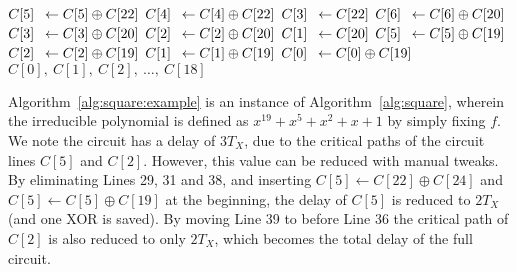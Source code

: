 \documentclass{ufscThesis}
\newcommand{\mathbox}[3][l]{\makebox[\widthof{$#2$}][#1]{$#3$}}
\begin{document}
\begin{algorithm}
\begin{multicols}{2}
\begin{algorithmic}[1]
\STATE $\mathbox{C[22]}{C[5]} \leftarrow C[5]  \oplus  C[22]$
\STATE $\mathbox{C[22]}{C[4]} \leftarrow C[4]  \oplus  C[22]$
\STATE $\mathbox{C[22]}{C[3]} \leftarrow C[22]$
\STATE $\mathbox{C[22]}{C[6]} \leftarrow C[6]  \oplus  C[20]$
\STATE $\mathbox{C[22]}{C[3]} \leftarrow C[3]  \oplus  C[20]$
\STATE $\mathbox{C[22]}{C[2]} \leftarrow C[2]  \oplus  C[20]$
\STATE $\mathbox{C[22]}{C[1]} \leftarrow C[20]$
\STATE $\mathbox{C[22]}{C[5]} \leftarrow C[5]  \oplus  C[19]$
\STATE $\mathbox{C[22]}{C[2]} \leftarrow C[2]  \oplus  C[19]$
\STATE $\mathbox{C[22]}{C[1]} \leftarrow C[1]  \oplus  C[19]$
\STATE $\mathbox{C[22]}{C[0]} \leftarrow C[0]  \oplus  C[19]$
\RETURN $C[0],~C[1],~C[2],~\ldots,~C[18]$
\end{algorithmic}
\end{multicols}
\end{algorithm}

Algorithm~\ref{alg:square:example} is an instance of Algorithm~\ref{alg:square}, wherein the irreducible polynomial is defined as $x^{19}+x^5+x^2+x+1$ by simply fixing $f$. We note the circuit has a delay of $3T_X$, due to the critical paths of the circuit lines $C[5]$ and $C[2]$. However, this value can be reduced with manual tweaks. By eliminating Lines 29, 31 and 38, and inserting $C[5] \leftarrow C[22] \oplus C[24]$ and $C[5] \leftarrow C[5] \oplus C[19]$ at the beginning, the delay of $C[5]$ is reduced to $2 T_X$ (and one XOR is saved). By moving Line 39 to before Line 36 the critical path of $C[2]$ is also reduced to only $2 T_X$, which becomes the total delay of the full circuit.
\end{document}
